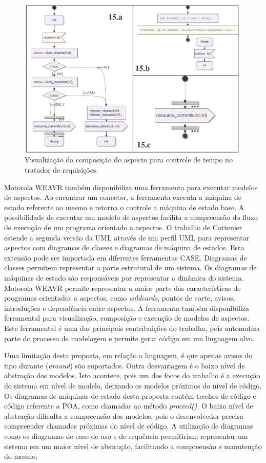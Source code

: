 \begin{figure}
	\centering
	\includegraphics[width=475px]{img/weavr_composed.png}
	\caption{Visualização da composição do aspecto
	para controle de tempo no tratador de requisições.}\label{fig:weavr_composed}
\end{figure}

Motorola WEAVR também disponibiliza uma ferramenta para executar modelos de aspectos. Ao encontrar um conector, a ferramenta executa a máquina de
estado referente ao mesmo e retorna o controle a máquina de estado base. A possibilidade de executar um modelo de aspectos facilita a compreensão do
fluxo de execução de um programa orientado a aspectos. O trabalho de Cottenier estende a segunda versão da UML através de um perfil UML para
representar aspectos com diagramas de classes e diagramas de máquina de estados. Esta extensão pode ser importada em diferentes ferramentas CASE. 
Diagramas de classes permitem representar a parte estrutural de um sistema. Os diagramas de máquinas de estado são responsáveis por representar a
dinâmica do sistema. Motorola WEAVR permite representar a maior parte das características de programas orientados a aspectos, como \textit{wildcards}, 
pontos de corte, avisos, introduções e dependência entre aspectos. A ferramenta também disponibiliza ferramental para visualização, composição e 
execução de modelos de aspectos. Este ferramental é uma das principais contribuições do trabalho, pois automatiza parte do processo de modelagem e
permite gerar código em um linguagem alvo.

Uma limitação desta proposta, em relação a linguagem, é que apenas avisos do tipo durante (\textit{around}) são suportados. Outra desvantagem é o baixo nível 
de abstração dos modelos. Isto acontece, pois um dos focos do trabalho é a execução do sistema em nível de modelo, deixando os modelos  próximos do
nível de código. Os diagramas de máquinas de estado desta proposta contém trechos de código e código referente a POA, como chamadas ao método \textit{proceed()}. 
O baixo nível de abstração dificulta a compreensão dos modelos, pois o desenvolvedor precisa compreender chamadas próximas do nível de código. A
utilização de diagramas como os diagramas de caso de uso e de sequência permitiriam representar um sistema em um maior nível de abstração, facilitando a compreensão 
e manutenção do mesmo. 

